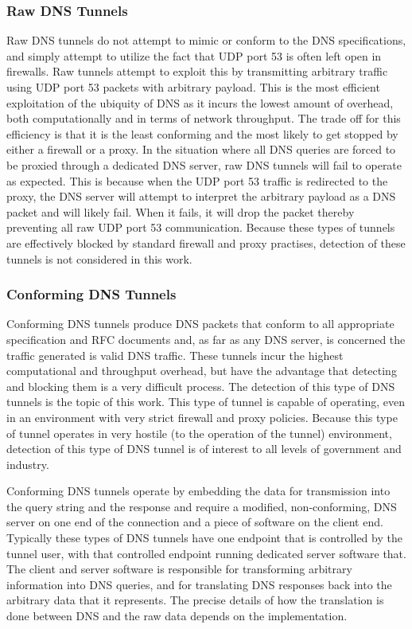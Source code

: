 \documentclass[12pt]{report}
\theoremstyle{remark}
\theoremstyle{definition}
\theoremstyle{definition}
\theoremstyle{definition}
\begin{document}
\subsubsection{Raw DNS Tunnels}
\label{dnstunnels.types.raw}
Raw DNS tunnels do not attempt to mimic or conform to the DNS
specifications, and simply attempt to utilize the fact that UDP port 53 is
often left open in firewalls. Raw tunnels attempt to exploit this by
transmitting arbitrary traffic using UDP port 53 packets with arbitrary payload.
This is the most efficient exploitation of the ubiquity of DNS as it incurs the
lowest amount of overhead, both computationally and in terms of network
throughput. The trade off for this efficiency is that it is the least
conforming and the most likely to get stopped by either a firewall or a proxy.
In the situation where all DNS queries are forced to be proxied through a
dedicated DNS server, raw DNS tunnels will fail to operate as expected. This is
because when the UDP port 53 traffic is redirected to the proxy, the DNS server
will attempt to interpret the arbitrary payload as a DNS packet and will likely
fail. When it fails, it will drop the packet thereby preventing all raw UDP
port 53 communication. Because these types of tunnels are effectively blocked by
standard firewall and proxy practises, detection of these tunnels is not
considered in this work.

\subsubsection{Conforming DNS Tunnels}
\label{dnstunnels.types.conforming}
Conforming DNS tunnels produce DNS packets that conform to all appropriate
specification and RFC documents and, as far as any DNS server, is concerned the
traffic generated is valid DNS traffic. These tunnels incur the highest
computational and throughput overhead, but have the advantage that detecting
and blocking them is a very difficult process. The detection of this type of
DNS tunnels is the topic of this work. This type of tunnel is capable of
operating, even in an environment with very strict firewall and proxy policies.
Because this type of tunnel operates in very hostile (to the operation of the
tunnel) environment, detection of this type of DNS tunnel is of interest to all
levels of government and industry.

Conforming DNS tunnels operate by embedding the data for transmission into the
query string and the response and require a modified, non-conforming, DNS
server on one end of the connection and a piece of software on the client end.
Typically these types of DNS tunnels have one endpoint that is controlled by the
tunnel user, with that controlled endpoint running dedicated server software
that. The client and server software is responsible for transforming arbitrary
information into DNS queries, and for translating DNS responses back into the
arbitrary data that it represents. The precise details of how the translation
is done between DNS and the raw data depends on the implementation.
\end{document}
